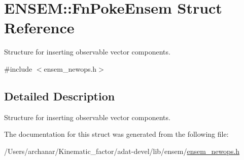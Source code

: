 \hypertarget{structENSEM_1_1FnPokeEnsem}{}\section{E\+N\+S\+EM\+:\+:Fn\+Poke\+Ensem Struct Reference}
\label{structENSEM_1_1FnPokeEnsem}


Structure for inserting observable vector components.  




{\ttfamily \#include $<$ensem\+\_\+newops.\+h$>$}



\subsection{Detailed Description}
Structure for inserting observable vector components. 

The documentation for this struct was generated from the following file\+:\begin{DoxyCompactItemize}
\item 
/\+Users/archanar/\+Kinematic\+\_\+factor/adat-\/devel/lib/ensem/\mbox{\hyperlink{adat-devel_2lib_2ensem_2ensem__newops_8h}{ensem\+\_\+newops.\+h}}\end{DoxyCompactItemize}
